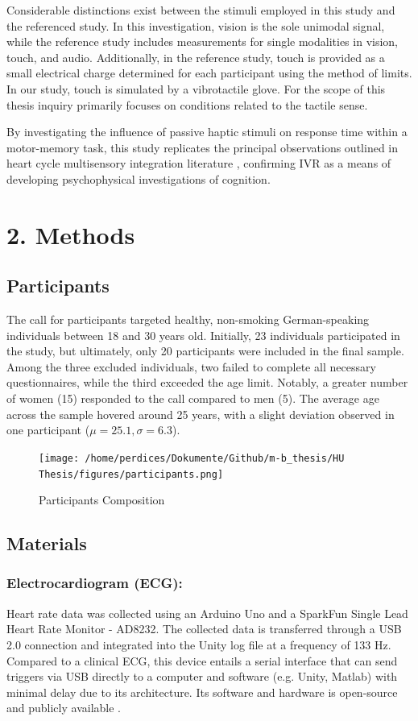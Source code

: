 \documentclass[12pt,oneside,openright]{report}
\begin{document}
Considerable distinctions exist between the stimuli employed in this study and the referenced study. In this investigation, vision is the sole unimodal signal, while the reference study includes measurements for single modalities in vision, touch, and audio. Additionally, in the reference study, touch is provided as a small electrical charge determined for each participant using the method of limits. In our study, touch is simulated by a vibrotactile glove. For the scope of this thesis inquiry primarily focuses on conditions related to the tactile sense.

By investigating the influence of passive haptic stimuli on response time within a motor-memory task, this study replicates the principal observations outlined in heart cycle multisensory integration literature \parencite{SALTAFOSSI2023108642}, confirming IVR as a means of developing psychophysical investigations of cognition.

\section*{2. Methods}
\subsection*{Participants}
The call for participants targeted healthy, non-smoking German-speaking individuals between 18 and 30 years old. Initially, 23 individuals participated in the study, but ultimately, only 20 participants were included in the final sample. Among the three excluded individuals, two failed to complete all necessary questionnaires, while the third exceeded the age limit. Notably, a greater number of women (15) responded to the call compared to men (5). The average age across the sample hovered around 25 years, with a slight deviation observed in one participant ($\mu=25.1, \sigma=6.3$).

\begin{figure}[h]
    \centering
    \texttt{[image: /home/perdices/Dokumente/Github/m-b\_thesis/HU Thesis/figures/participants.png]}
    \caption{Participants Composition}
    \label{fig:mesh1}
\end{figure}

    
\subsection*{Materials}
\subsubsection*{Electrocardiogram (ECG):}
Heart rate data was collected using an Arduino Uno and a SparkFun Single Lead Heart Rate Monitor - AD8232. The collected data is transferred through a USB 2.0 connection and integrated into the Unity log file at a frequency of 133 Hz. Compared to a clinical ECG, this device entails a serial interface that can send triggers via USB directly to a computer and software (e.g. Unity, Matlab) with minimal delay due to its architecture. Its software and hardware is open-source and publicly available \parencite{TimsECG}.
\end{document}
